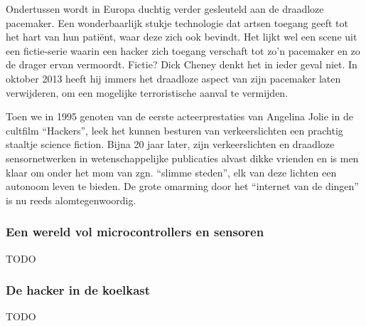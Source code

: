\documentclass[DIV=calc,paper=a4,fontsize=11pt,twocolumn,draft]{scrartcl}
\begin{document}
Ondertussen wordt in Europa duchtig verder gesleuteld aan de draadloze
pacemaker. Een wonderbaarlijk stukje technologie dat artsen toegang geeft tot
het hart van hun pati\"ent, waar deze zich ook bevindt. Het lijkt wel een scene
uit een fictie-serie waarin een hacker zich toegang verschaft tot zo'n
pacemaker en zo de drager ervan vermoordt. Fictie? Dick Cheney denkt het in
ieder geval niet. In oktober 2013 heeft hij immers het draadloze aspect van
zijn pacemaker laten verwijderen, om een mogelijke terroristische aanval te
vermijden.

Toen we in 1995 genoten van de eerste acteerprestaties van Angelina Jolie in de
cultfilm ``Hackers'', leek het kunnen besturen van verkeerslichten een prachtig
staaltje science fiction. Bijna 20 jaar later, zijn verkeerslichten en
draadloze sensornetwerken in wetenschappelijke publicaties alvast dikke
vrienden en is men klaar om onder het mom van zgn. ``slimme steden'', elk van
deze lichten een autonoom leven te bieden. De grote omarming door het
``internet van de dingen'' is nu reeds alomtegenwoordig.

\subsubsection*{Een wereld vol microcontrollers en sensoren}
\vspace{-3mm}

TODO

\subsubsection*{De hacker in de koelkast}
\vspace{-3mm}

TODO


\lipsum[1-10]
\end{document}
